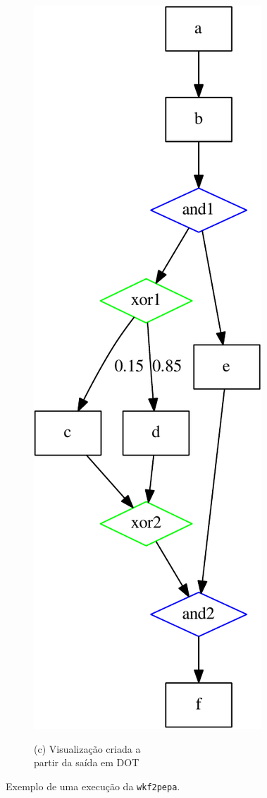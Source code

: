 \documentclass[a4paper,10pt]{article}
\begin{document}
\begin{figure}[h]
\begin{subfigure}[b]{0.4\textwidth}
                \includegraphics[scale=0.55]{example-crop.pdf}

                (c) Visualização criada a \\ partir da saída em DOT
                \label{fig:tiger}
        \end{subfigure}
        \caption{Exemplo de uma execução da \texttt{wkf2pepa}.}
        \label{fig:exemplo}
\end{figure}\\
\end{document}
